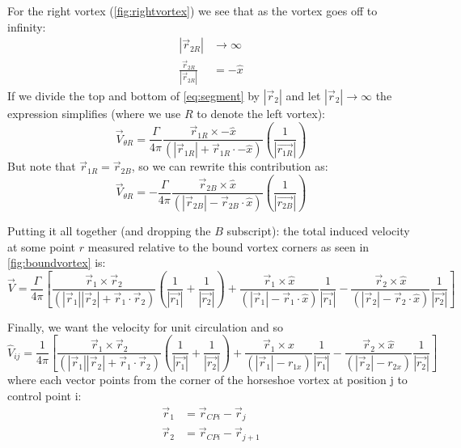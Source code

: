 \documentclass{article}
\begin{document}
For the right vortex (\cref{fig:rightvortex}) 
we see that as the vortex goes off to infinity:
\begin{align}
|\vec{r}_{2R}| &\rightarrow \infty\\
\frac{\vec{r}_{2R}}{|\vec{r}_{2R}|} &= -\hat{x}
\end{align}
If we divide the top and bottom of \cref{eq:segment} by $|\vec{r}_2|$ and let $|\vec{r}_2| \rightarrow \infty$ the expression simplifies (where we use $R$ to denote the left vortex):
\begin{equation}
\vec{V}_{\theta R} = \frac{\Gamma}{4 \pi} \frac{\vec{r}_{1R} \times -\hat{x}}{(|\vec{r}_{1R}| + \vec{r}_{1R} \cdot -\hat{x})} \left(\frac{1}{|\vec{r_{1R}}|} \right)
\end{equation}
But note that $\vec{r}_{1R} = \vec{r}_{2B}$, so we can rewrite this contribution as:
\begin{equation}
\vec{V}_{\theta R} = -\frac{\Gamma}{4 \pi} \frac{\vec{r}_{2B} \times \hat{x}}{(|\vec{r}_{2B}| - \vec{r}_{2B} \cdot \hat{x})} \left(\frac{1}{|\vec{r_{2B}}|} \right)
\end{equation}

Putting it all together (and dropping the $B$ subscript): the total induced velocity at some point $r$ measured relative to the bound vortex corners as seen in \cref{fig:boundvortex} is:
\begin{equation}
\vec{V} = 
\frac{\Gamma}{4 \pi} 
\left[
\frac{\vec{r}_{1} \times \vec{r}_{2}}{(|\vec{r}_{1}||\vec{r}_{2}| + \vec{r}_{1} \cdot \vec{r}_{2})} \left(\frac{1}{|\vec{r_{1}}|} + \frac{1}{|\vec{r_{2}}|} \right)
+
\frac{\vec{r}_{1} \times \hat{x}}{(|\vec{r}_{1}| - \vec{r}_{1} \cdot \hat{x})} \frac{1}{|\vec{r_{1}}|} 
-
\frac{\vec{r}_{2} \times \hat{x}}{(|\vec{r}_{2}| - \vec{r}_{2} \cdot \hat{x})} \frac{1}{|\vec{r_{2}}|} 
\right]
\end{equation}

Finally, we want the velocity for unit circulation and so 
\begin{equation}
\hat{V}_{ij} = 
\frac{1}{4 \pi} 
\left[
\frac{\vec{r}_{1} \times \vec{r}_{2}}{(|\vec{r}_{1}||\vec{r}_{2}| + \vec{r}_{1} \cdot \vec{r}_{2})} \left(\frac{1}{|\vec{r_{1}}|} + \frac{1}{|\vec{r_{2}}|} \right)
+
\frac{\vec{r}_{1} \times \hat{x}}{(|\vec{r}_{1}| - r_{1x})} \frac{1}{|\vec{r_{1}}|} 
-
\frac{\vec{r}_{2} \times \hat{x}}{(|\vec{r}_{2}| - r_{2x} )} \frac{1}{|\vec{r_{2}}|} 
\right]
\label{eq:vhorseshoe}
\end{equation}
where each vector points from the corner of the horseshoe vortex at position j to control point i:
\begin{align}
\vec{r}_1 &= \vec{r}_{CPi} - \vec{r}_{j}\\
\vec{r}_2 &= \vec{r}_{CPi} - \vec{r}_{j+1}
\end{align}
\end{document}
